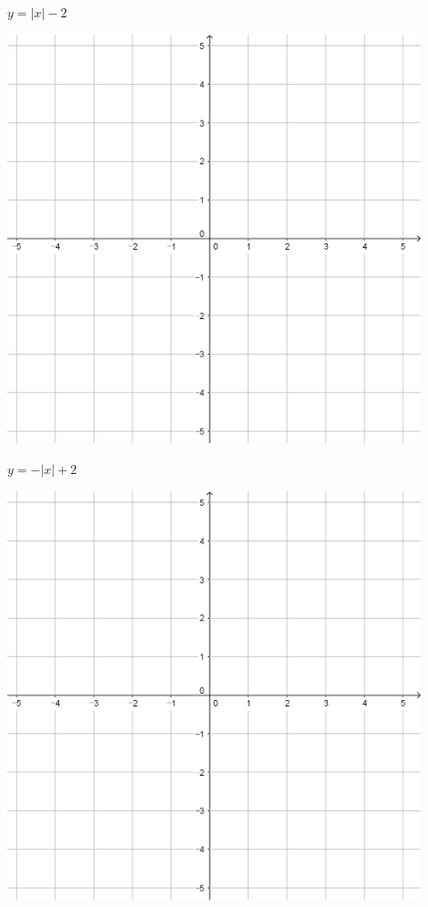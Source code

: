 \documentclass[a4paper]{oblivoir}
\begin{document}
\begin{minipage}{0.45\textwidth}\centering
\(y=|x|-2\)
\par\bigskip\includegraphics[width=0.9\textwidth]{55}
\end{minipage}
\begin{minipage}{0.45\textwidth}\centering
\(y=-|x|+2\)
\par\bigskip\includegraphics[width=0.9\textwidth]{55}
\end{minipage}\bigskip\bigskip\par
\end{document}
